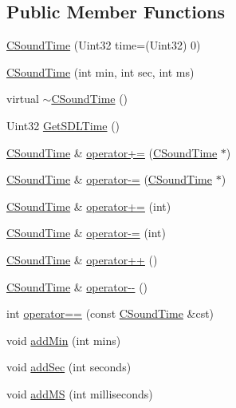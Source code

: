 \subsection*{Public Member Functions}
\begin{DoxyCompactItemize}
\item 
\hyperlink{class_c_sound_time_a62023afd804cc88b62c5e3c252ac34a0}{C\+Sound\+Time} (Uint32 time=(Uint32) 0)
\item 
\hyperlink{class_c_sound_time_a2c7d5ed3ab0ca06783843ce011cf1620}{C\+Sound\+Time} (int min, int sec, int ms)
\item 
virtual \hyperlink{class_c_sound_time_a642d1ff52e745142940ca9129cc055dd}{$\sim$\+C\+Sound\+Time} ()
\item 
Uint32 \hyperlink{class_c_sound_time_a51ef710780c9680f685b39421d605377}{Get\+S\+D\+L\+Time} ()
\item 
\hyperlink{class_c_sound_time}{C\+Sound\+Time} \& \hyperlink{class_c_sound_time_aad8532b1cbcd5bd11a868387e096011e}{operator+=} (\hyperlink{class_c_sound_time}{C\+Sound\+Time} $\ast$)
\item 
\hyperlink{class_c_sound_time}{C\+Sound\+Time} \& \hyperlink{class_c_sound_time_ad87a113b078f7f943d70332f5a961104}{operator-\/=} (\hyperlink{class_c_sound_time}{C\+Sound\+Time} $\ast$)
\item 
\hyperlink{class_c_sound_time}{C\+Sound\+Time} \& \hyperlink{class_c_sound_time_a7d35c9b41af69c5db3505f99a029f0c9}{operator+=} (int)
\item 
\hyperlink{class_c_sound_time}{C\+Sound\+Time} \& \hyperlink{class_c_sound_time_a382895ae3c4f835211054afd1d791479}{operator-\/=} (int)
\item 
\hyperlink{class_c_sound_time}{C\+Sound\+Time} \& \hyperlink{class_c_sound_time_a7d363df0d4380e275660cfe8a553a604}{operator++} ()
\item 
\hyperlink{class_c_sound_time}{C\+Sound\+Time} \& \hyperlink{class_c_sound_time_adb21b0993964903cae5bd427826fd825}{operator-\/-\/} ()
\item 
int \hyperlink{class_c_sound_time_ac16e19ca4933f5ca7f316d8c409ca71d}{operator==} (const \hyperlink{class_c_sound_time}{C\+Sound\+Time} \&cst)
\item 
void \hyperlink{class_c_sound_time_a6f217edcd34b4c555a15b4eecf9cb324}{add\+Min} (int mins)
\item 
void \hyperlink{class_c_sound_time_a75adfe86a4342bf30b86d91d425b5f1d}{add\+Sec} (int seconds)
\item 
void \hyperlink{class_c_sound_time_ae85160ad6855d23f0dceb27be8375dd0}{add\+MS} (int milliseconds)
\end{DoxyCompactItemize}

